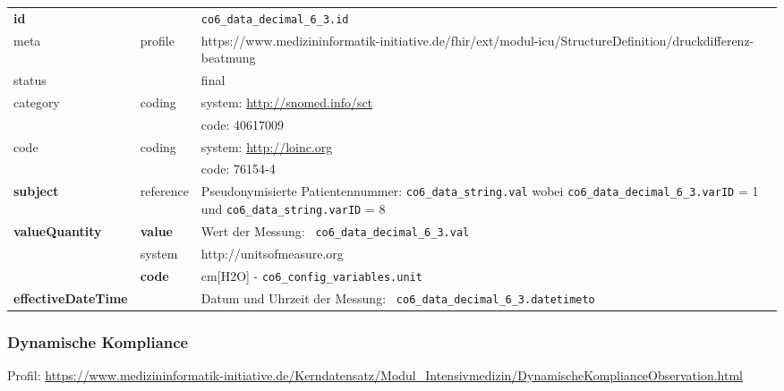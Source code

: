 \begin{longtable}{|l|l|p{7.5cm}|}
        \hline
        \rowcolor{lightgray} \multicolumn{3}{|l|}{Data Mapping (inhaltlich)} \\ \hline
        \textbf{id} &  & \texttt{co6\_data\_decimal\_6\_3.id} \\ \hline
	meta & profile & https://www.medizininformatik-initiative.de/fhir/ext/modul-icu/StructureDefinition/druckdifferenz-beatmung \\ \hline 
	status &  & final   \\ \hline 
	category & coding & system: \url{http://snomed.info/sct} \\
\cline{3-3}
	& & code: 40617009 \\ \hline
	code & coding & system: \url{http://loinc.org} \\ 
	\cline{3-3} 
	 &  & code: 76154-4 \\ \hline
	 \textbf{subject} & reference & Pseudonymisierte Patientennummer: \texttt{co6\_data\_string.val} wobei \texttt{co6\_data\_decimal\_6\_3.varID} = 1 und \texttt{co6\_data\_string.varID} = 8 \\ \hline
	 \textbf{valueQuantity}  & \textbf{value} & Wert der Messung: \texttt{
co6\_data\_decimal\_6\_3.val} \\
        \cline{2-3}
         & system & http://unitsofmeasure.org \\
         \cline{2-3}
         & \textbf{code} &
cm[H2O] - \texttt{co6\_config\_variables.unit}
\\ \hline
     \textbf{effectiveDateTime}  & & Datum und Uhrzeit der Messung: \texttt{
co6\_data\_decimal\_6\_3.datetimeto} \\ \hline
\end{longtable}

\subsubsection{Dynamische Kompliance} 

Profil: \url{https://www.medizininformatik-initiative.de/Kerndatensatz/Modul_Intensivmedizin/DynamischeKomplianceObservation.html}

